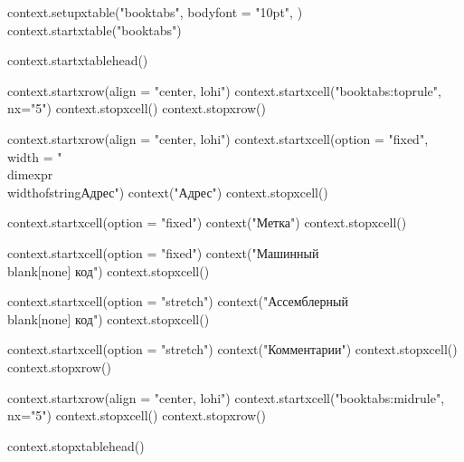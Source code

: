     context.setupxtable({"booktabs"}, {
        bodyfont = "10pt",
    })
    context.startxtable({"booktabs"})

    context.startxtablehead()

    context.startxrow({align = "center, lohi"})
        context.startxcell({"booktabs:toprule"}, {nx="5"})
        context.stopxcell()
    context.stopxrow()

    context.startxrow({align = "center, lohi"})
        context.startxcell({option = "fixed", width = "\\dimexpr\\widthofstring{Адрес}"})
            context("Адрес")
        context.stopxcell()

        context.startxcell({option = "fixed"})
            context("Метка")
        context.stopxcell()

        context.startxcell({option = "fixed"})
            context("Машинный\\blank[none] код")
        context.stopxcell()

        context.startxcell({option = "stretch"})
            context("Ассемблерный\\blank[none] код")
        context.stopxcell()

        context.startxcell({option = "stretch"})
            context("Комментарии")
        context.stopxcell()
    context.stopxrow()

    context.startxrow({align = "center, lohi"})
        context.startxcell({"booktabs:midrule"}, {nx="5"})
        context.stopxcell()
    context.stopxrow()

    context.stopxtablehead()

